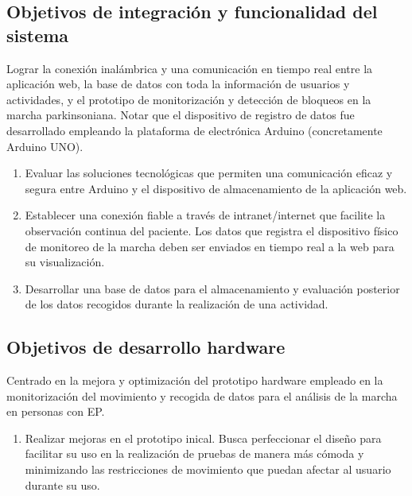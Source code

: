 \subsection{Objetivos de integración y funcionalidad del sistema}
Lograr la conexión inalámbrica y una comunicación en tiempo real entre la aplicación web, la base de datos con toda la información de usuarios y actividades, y el prototipo de monitorización y detección de bloqueos en la marcha parkinsoniana. Notar que el dispositivo de registro de datos fue desarrollado empleando la plataforma de electrónica Arduino (concretamente Arduino UNO).
\begin{enumerate}
    \item Evaluar las soluciones tecnológicas que permiten una comunicación eficaz y segura entre Arduino y el dispositivo de almacenamiento de la aplicación web.
    \item Establecer una conexión fiable a través de intranet/internet que facilite la observación continua del paciente. Los datos que registra el dispositivo físico de monitoreo de la marcha deben ser enviados en tiempo real a la web para su visualización. 
    \item Desarrollar una base de datos para el almacenamiento y evaluación posterior de los datos recogidos durante la realización de una actividad.
\end{enumerate}

\subsection{Objetivos de desarrollo hardware}
Centrado en la mejora y optimización del prototipo hardware empleado en la monitorización del movimiento y recogida de datos para el análisis de la marcha en personas con EP.
\begin{enumerate}
    \item Realizar mejoras en el prototipo inical. Busca perfeccionar el diseño para facilitar su uso en la realización de pruebas de manera más cómoda y minimizando las restricciones de movimiento que puedan afectar al usuario durante su uso.
\end{enumerate}















